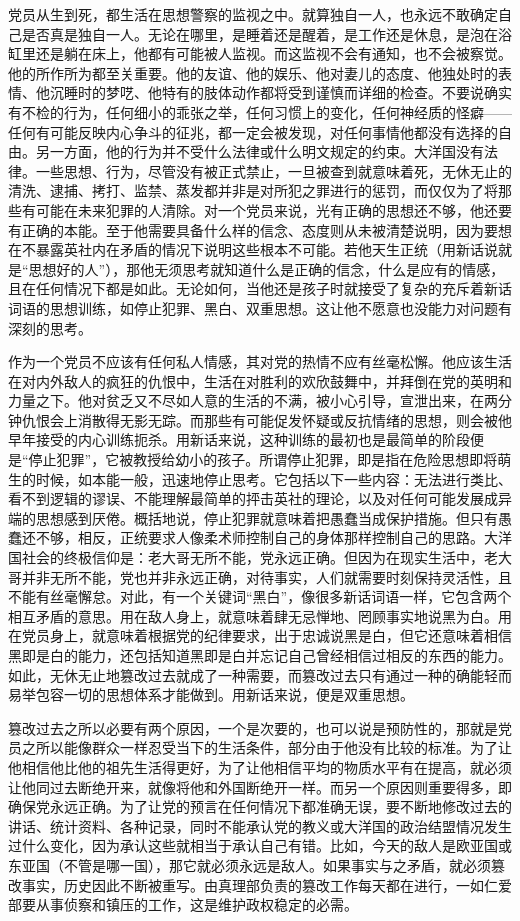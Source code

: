 党员从生到死，都生活在思想警察的监视之中。就算独自一人，也永远不敢确定自己是否真是独自一人。无论在哪里，是睡着还是醒着，是工作还是休息，是泡在浴缸里还是躺在床上，他都有可能被人监视。而这监视不会有通知，也不会被察觉。他的所作所为都至关重要。他的友谊、他的娱乐、他对妻儿的态度、他独处时的表情、他沉睡时的梦呓、他特有的肢体动作都将受到谨慎而详细的检查。不要说确实有不检的行为，任何细小的乖张之举，任何习惯上的变化，任何神经质的怪癖------任何有可能反映内心争斗的征兆，都一定会被发现，对任何事情他都没有选择的自由。另一方面，他的行为并不受什么法律或什么明文规定的约束。大洋国没有法律。一些思想、行为，尽管没有被正式禁止，一旦被查到就意味着死，无休无止的清洗、逮捕、拷打、监禁、蒸发都并非是对所犯之罪进行的惩罚，而仅仅为了将那些有可能在未来犯罪的人清除。对一个党员来说，光有正确的思想还不够，他还要有正确的本能。至于他需要具备什么样的信念、态度则从未被清楚说明，因为要想在不暴露英社内在矛盾的情况下说明这些根本不可能。若他天生正统（用新话说就是``思想好的人''），那他无须思考就知道什么是正确的信念，什么是应有的情感，且在任何情况下都是如此。无论如何，当他还是孩子时就接受了复杂的充斥着新话词语的思想训练，如停止犯罪、黑白、双重思想。这让他不愿意也没能力对问题有深刻的思考。

作为一个党员不应该有任何私人情感，其对党的热情不应有丝毫松懈。他应该生活在对内外敌人的疯狂的仇恨中，生活在对胜利的欢欣鼓舞中，并拜倒在党的英明和力量之下。他对贫乏又不尽如人意的生活的不满，被小心引导，宣泄出来，在两分钟仇恨会上消散得无影无踪。而那些有可能促发怀疑或反抗情绪的思想，则会被他早年接受的内心训练扼杀。用新话来说，这种训练的最初也是最简单的阶段便是``停止犯罪''，它被教授给幼小的孩子。所谓停止犯罪，即是指在危险思想即将萌生的时候，如本能一般，迅速地停止思考。它包括以下一些内容：无法进行类比、看不到逻辑的谬误、不能理解最简单的抨击英社的理论，以及对任何可能发展成异端的思想感到厌倦。概括地说，停止犯罪就意味着把愚蠢当成保护措施。但只有愚蠢还不够，相反，正统要求人像柔术师控制自己的身体那样控制自己的思路。大洋国社会的终极信仰是：老大哥无所不能，党永远正确。但因为在现实生活中，老大哥并非无所不能，党也并非永远正确，对待事实，人们就需要时刻保持灵活性，且不能有丝毫懈怠。对此，有一个关键词``黑白''，像很多新话词语一样，它包含两个相互矛盾的意思。用在敌人身上，就意味着肆无忌惮地、罔顾事实地说黑为白。用在党员身上，就意味着根据党的纪律要求，出于忠诚说黑是白，但它还意味着相信黑即是白的能力，还包括知道黑即是白并忘记自己曾经相信过相反的东西的能力。如此，无休无止地篡改过去就成了一种需要，而篡改过去只有通过一种的确能轻而易举包容一切的思想体系才能做到。用新话来说，便是双重思想。

篡改过去之所以必要有两个原因，一个是次要的，也可以说是预防性的，那就是党员之所以能像群众一样忍受当下的生活条件，部分由于他没有比较的标准。为了让他相信他比他的祖先生活得更好，为了让他相信平均的物质水平有在提高，就必须让他同过去断绝开来，就像将他和外国断绝开一样。而另一个原因则重要得多，即确保党永远正确。为了让党的预言在任何情况下都准确无误，要不断地修改过去的讲话、统计资料、各种记录，同时不能承认党的教义或大洋国的政治结盟情况发生过什么变化，因为承认这些就相当于承认自己有错。比如，今天的敌人是欧亚国或东亚国（不管是哪一国），那它就必须永远是敌人。如果事实与之矛盾，就必须篡改事实，历史因此不断被重写。由真理部负责的篡改工作每天都在进行，一如仁爱部要从事侦察和镇压的工作，这是维护政权稳定的必需。

